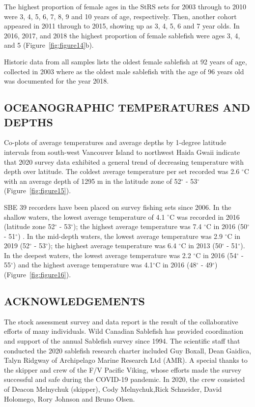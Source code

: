 \documentclass[12pt]{article}\usepackage[]{graphicx}\usepackage[]{color}
\begin{document}
The highest proportion of female ages in the StRS sets for 2003 through to 2010 were 3, 4, 5, 6, 7, 8, 9 and 10 years of age, respectively. Then, another cohort appeared in 2011 through to 2015, showing up as 3, 4, 5, 6 and 7 year olds. In 2016, 2017, and 2018 the highest proportion of female sablefish were ages 3, 4, and 5 (Figure~\ref{fig:figure14}b).

Historic data from all samples lists the oldest female sablefish at 92 years of age, collected in 2003 where as the oldest male sablefish with the age of 96 years old was documented for the year 2018.

\hypertarget{oceanographic-temperatures-and-depths}{%
\subsection{OCEANOGRAPHIC TEMPERATURES AND DEPTHS}\label{oceanographic-temperatures-and-depths}}

Co-plots of average temperatures and average depths by 1-degree latitude intervals from south-west Vancouver Island to northwest Haida Gwaii indicate that 2020 survey data exhibited a general trend of decreasing temperature with depth over latitude. The coldest average temperature per set recorded was 2.6 \(^\circ\)C with an average depth of 1295 m in the latitude zone of 52\(^\circ\) - 53\(^\circ\) (Figure~\ref{fig:figure15}).

SBE 39 recorders have been placed on survey fishing sets since 2006. In the shallow waters, the lowest average temperature of 4.1 \(^\circ\)C was recorded in 2016 (latitude zone 52\(^\circ\) - 53\(^\circ\)); the highest average temperature was 7.4 \(^\circ\)C in 2016 (50\(^\circ\) - 51\(^\circ\)) . In the mid-depth waters, the lowest average temperature was 2.9 \(^\circ\)C in 2019 (52\(^\circ\) - 53\(^\circ\)); the highest average temperature was 6.4 \(^\circ\)C in 2013 (50\(^\circ\) - 51\(^\circ\)). In the deepest waters, the lowest average temperature was 2.2 \(^\circ\)C in 2016 (54\(^\circ\) - 55\(^\circ\)) and the highest average temperature was 4.1\(^\circ\)C in 2016 (48\(^\circ\) - 49\(^\circ\)) (Figure~\ref{fig:figure16}).

\hypertarget{acknowledgements}{%
\subsection{ACKNOWLEDGEMENTS}\label{acknowledgements}}

The stock assessment survey and data report is the result of the collaborative efforts of many individuals. Wild Canadian Sablefish has provided coordination and support of the annual Sablefish survey since 1994. The scientific staff that conducted the 2020 sablefish research charter included Guy Boxall, Dean Gaidica, Talyn Ridgway of Archipelago Marine Research Ltd (AMR). A special thanks to the skipper and crew of the F/V Pacific Viking, whose efforts made the survey successful and safe during the COVID-19 pandemic. In 2020, the crew consisted of Deacon Melnychuk (skipper), Cody Melnychuk,Rick Schneider, David Holomego, Rory Johnson and Bruno Olsen.
\end{document}
